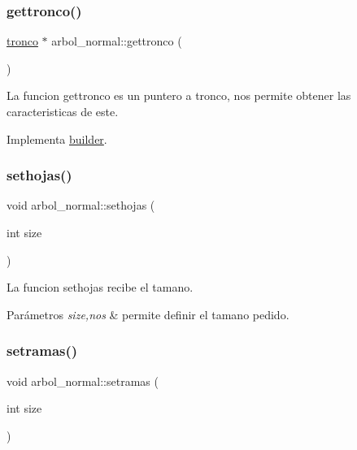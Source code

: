 \subsubsection{\texorpdfstring{gettronco()}{gettronco()}}
{\footnotesize\ttfamily \hyperlink{classtronco}{tronco} $\ast$ arbol\+\_\+normal\+::gettronco (\begin{DoxyParamCaption}{ }\end{DoxyParamCaption})\hspace{0.3cm}{\ttfamily [virtual]}}

La funcion gettronco es un puntero a tronco, nos permite obtener las caracteristicas de este. 

Implementa \hyperlink{classbuilder_af81e62bdfc53bbdad5f1d8edc4b46ecd}{builder}.

\mbox{\label{classarbol__normal_a21fb8efde2259a78b694a81ecb543a07}} 
\subsubsection{\texorpdfstring{sethojas()}{sethojas()}}
{\footnotesize\ttfamily void arbol\+\_\+normal\+::sethojas (\begin{DoxyParamCaption}\item[{int}]{size }\end{DoxyParamCaption})}

La funcion sethojas recibe el tamano. 
\begin{DoxyParams}{Parámetros}
{\em size,nos} & permite definir el tamano pedido. \\
\hline
\end{DoxyParams}
\mbox{\label{classarbol__normal_a48dbb830f192cf75d87adb80ec23ea7d}} 
\subsubsection{\texorpdfstring{setramas()}{setramas()}}
{\footnotesize\ttfamily void arbol\+\_\+normal\+::setramas (\begin{DoxyParamCaption}\item[{int}]{size }\end{DoxyParamCaption})}

